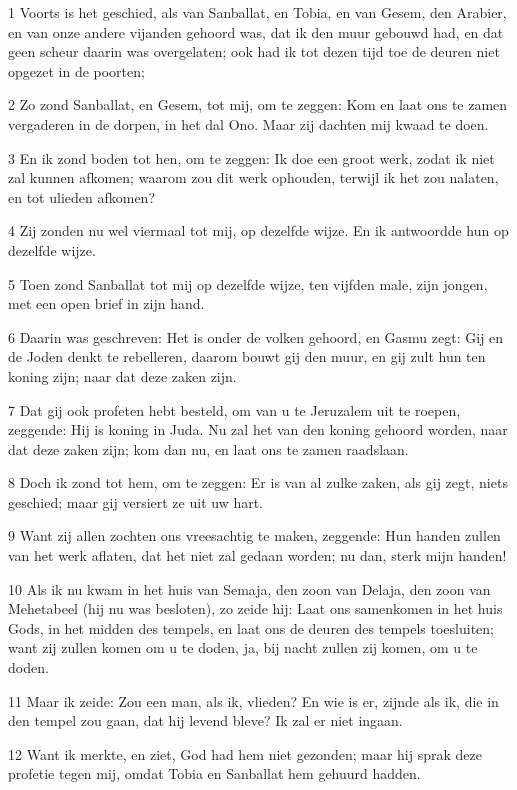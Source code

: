 \par 1 Voorts is het geschied, als van Sanballat, en Tobia, en van Gesem, den Arabier, en van onze andere vijanden gehoord was, dat ik den muur gebouwd had, en dat geen scheur daarin was overgelaten; ook had ik tot dezen tijd toe de deuren niet opgezet in de poorten;
\par 2 Zo zond Sanballat, en Gesem, tot mij, om te zeggen: Kom en laat ons te zamen vergaderen in de dorpen, in het dal Ono. Maar zij dachten mij kwaad te doen.
\par 3 En ik zond boden tot hen, om te zeggen: Ik doe een groot werk, zodat ik niet zal kunnen afkomen; waarom zou dit werk ophouden, terwijl ik het zou nalaten, en tot ulieden afkomen?
\par 4 Zij zonden nu wel viermaal tot mij, op dezelfde wijze. En ik antwoordde hun op dezelfde wijze.
\par 5 Toen zond Sanballat tot mij op dezelfde wijze, ten vijfden male, zijn jongen, met een open brief in zijn hand.
\par 6 Daarin was geschreven: Het is onder de volken gehoord, en Gasmu zegt: Gij en de Joden denkt te rebelleren, daarom bouwt gij den muur, en gij zult hun ten koning zijn; naar dat deze zaken zijn.
\par 7 Dat gij ook profeten hebt besteld, om van u te Jeruzalem uit te roepen, zeggende: Hij is koning in Juda. Nu zal het van den koning gehoord worden, naar dat deze zaken zijn; kom dan nu, en laat ons te zamen raadslaan.
\par 8 Doch ik zond tot hem, om te zeggen: Er is van al zulke zaken, als gij zegt, niets geschied; maar gij versiert ze uit uw hart.
\par 9 Want zij allen zochten ons vreesachtig te maken, zeggende: Hun handen zullen van het werk aflaten, dat het niet zal gedaan worden; nu dan, sterk mijn handen!
\par 10 Als ik nu kwam in het huis van Semaja, den zoon van Delaja, den zoon van Mehetabeel (hij nu was besloten), zo zeide hij: Laat ons samenkomen in het huis Gods, in het midden des tempels, en laat ons de deuren des tempels toesluiten; want zij zullen komen om u te doden, ja, bij nacht zullen zij komen, om u te doden.
\par 11 Maar ik zeide: Zou een man, als ik, vlieden? En wie is er, zijnde als ik, die in den tempel zou gaan, dat hij levend bleve? Ik zal er niet ingaan.
\par 12 Want ik merkte, en ziet, God had hem niet gezonden; maar hij sprak deze profetie tegen mij, omdat Tobia en Sanballat hem gehuurd hadden.
